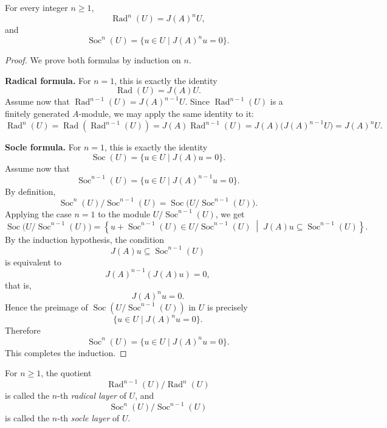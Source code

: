 \begin{proposition}
    For every integer $n\ge 1$,\label{prop:rad-soc-formulas}
    \[
        \operatorname{Rad}^n(U)=J(A)^nU,
    \]
    and
    \[
        \operatorname{Soc}^n(U)=\{u\in U\mid J(A)^n u=0\}.
    \]
\end{proposition}

\begin{proof}
    We prove both formulas by induction on $n$.

    \medskip

    \noindent
    \textbf{Radical formula.}
    For $n=1$, this is exactly the identity
    \[
        \operatorname{Rad}(U)=J(A)U.
    \]
    Assume now that $\operatorname{Rad}^{n-1}(U)=J(A)^{n-1}U$. Since $\operatorname{Rad}^{n-1}(U)$ is a finitely generated
    $A$-module, we may apply the same identity to it:
    \[
        \operatorname{Rad}^n(U)
        =\operatorname{Rad}(\operatorname{Rad}^{n-1}(U))
        =J(A)\operatorname{Rad}^{n-1}(U)
        =J(A)\bigl(J(A)^{n-1}U\bigr)
        =J(A)^nU.
    \]

    \medskip

    \noindent
    \textbf{Socle formula.}
    For $n=1$, this is exactly the identity
    \[
        \operatorname{Soc}(U)=\{u\in U\mid J(A)u=0\}.
    \]
    Assume now that
    \[
        \operatorname{Soc}^{n-1}(U)=\{u\in U\mid J(A)^{n-1}u=0\}.
    \]
    By definition,
    \[
        \operatorname{Soc}^n(U)/\operatorname{Soc}^{n-1}(U)
        =
        \operatorname{Soc}\bigl(U/\operatorname{Soc}^{n-1}(U)\bigr).
    \]
    Applying the case $n=1$ to the module $U/\operatorname{Soc}^{n-1}(U)$, we get
    \[
        \operatorname{Soc}\bigl(U/\operatorname{Soc}^{n-1}(U)\bigr)
        =
        \left\{
        u+\operatorname{Soc}^{n-1}(U)\in U/\operatorname{Soc}^{n-1}(U)
        \;\middle|\;
        J(A)u\subseteq \operatorname{Soc}^{n-1}(U)
        \right\}.
    \]
    By the induction hypothesis, the condition
    \[
        J(A)u\subseteq \operatorname{Soc}^{n-1}(U)
    \]
    is equivalent to
    \[
        J(A)^{n-1}(J(A)u)=0,
    \]
    that is,
    \[
        J(A)^n u=0.
    \]
    Hence the preimage of $\operatorname{Soc}(U/\operatorname{Soc}^{n-1}(U))$ in $U$ is precisely
    \[
        \{u\in U\mid J(A)^n u=0\}.
    \]
    Therefore
    \[
        \operatorname{Soc}^n(U)=\{u\in U\mid J(A)^n u=0\}.
    \]
    This completes the induction.
\end{proof}

\begin{remark}
    For $n\ge 1$, the quotient
    \[
        \operatorname{Rad}^{n-1}(U)/\operatorname{Rad}^n(U)
    \]
    is called the $n$-th \emph{radical layer} of $U$, and
    \[
        \operatorname{Soc}^n(U)/\operatorname{Soc}^{n-1}(U)
    \]
    is called the $n$-th \emph{socle layer} of $U$.
\end{remark}

